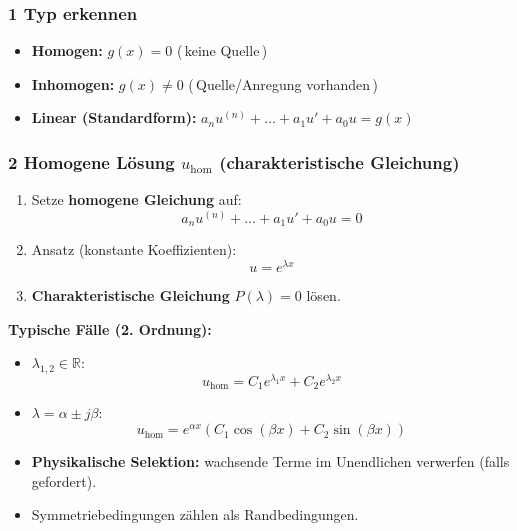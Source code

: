 \documentclass[a4paper]{article}
\newcommand{\imp}[1]{{\color{accent}\bfseries #1}}
\begin{document}
\subsubsection{1 Typ erkennen}
\begin{schema}
\begin{itemize}
  \item \imp{Homogen:} $g(x)=0$ \;\;\;(\,keine Quelle\,)
  \item \imp{Inhomogen:} $g(x)\neq 0$ \;\;\;(\,Quelle/Anregung vorhanden\,)
  \item \imp{Linear (Standardform):} $a_n u^{(n)} + \dots + a_1 u' + a_0 u = g(x)$
\end{itemize}
\end{schema}

\subsubsection{2 Homogene Lösung $u_{\text{hom}}$ (charakteristische Gleichung)}
\begin{vorgehen}
\begin{enumerate}
  \item Setze \imp{homogene Gleichung} auf:
  \[
  a_n u^{(n)} + \dots + a_1 u' + a_0 u = 0
  \]
  \item Ansatz (konstante Koeffizienten):
  \[
  u = e^{\lambda x}
  \]
  \item \imp{Charakteristische Gleichung} $P(\lambda)=0$ lösen.
\end{enumerate}
\end{vorgehen}

\begin{schema}
\imp{Typische Fälle (2. Ordnung):}
\begin{itemize}
  \item $\lambda_{1,2}\in\mathbb{R}$:
  \[
  u_{\text{hom}} = C_1 e^{\lambda_1 x} + C_2 e^{\lambda_2 x}
  \]
  \item $\lambda=\alpha \pm j\beta$:
  \[
  u_{\text{hom}} = e^{\alpha x}\left(C_1 \cos(\beta x) + C_2 \sin(\beta x)\right)
  \]
\end{itemize}
\end{schema}

\begin{checkitem}
\begin{itemize}
  \item \imp{Physikalische Selektion:} wachsende Terme im Unendlichen verwerfen (falls gefordert).
  \item Symmetriebedingungen zählen als Randbedingungen.
\end{itemize}
\end{checkitem}
\end{document}
